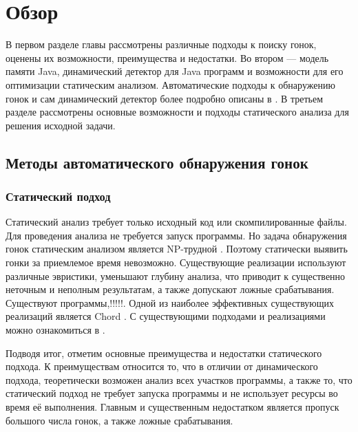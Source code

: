 \chapter{Обзор}
\label{chapSVD}

В первом разделе главы рассмотрены различные подходы к поиску гонок, оценены их возможности, преимущества и недостатки. 
Во втором --- модель памяти Java, динамический детектор для Java программ и возможности для его оптимизации статическим анализом.
Автоматические подходы к обнаружению гонок и сам динамический детектор более подробно описаны в \cite{DRD}.
В третьем разделе рассмотрены основные возможности и подходы статического анализа для решения исходной задачи.


\FloatBarrier
\section{Методы автоматического обнаружения гонок}
\subsection{Статический подход}
\label{StaticRaceDetection}
Статический анализ требует только исходный код или скомпилированные файлы. Для проведения анализа не требуется запуск программы. Но задача обнаружения гонок статическим анализом является NP-трудной \cite{RaceDetectionReview, RaceDetection}. Поэтому статически выявить гонки за приемлемое время невозможно. Существующие реализации используют различные эвристики, уменьшают глубину анализа, что приводит к существенно неточным и неполным результатам, а также допускают ложные срабатывания. Существуют программы,!!!!!. Одной из наиболее эффективных существующих реализаций является Chord \cite{Chord, JChord}.
 С существующими подходами и реализациями можно ознакомиться в \cite{Naik:2006:ESR:1133255.1134018, RacerX}.

Подводя итог, отметим основные преимущества и недостатки статического подхода. К преимуществам относится то, что в отличии от динамического подхода, теоретически возможен анализ всех участков программы, а также то, что статический подход не требует запуска программы и не использует ресурсы во время её выполнения. Главным и существенным недостатком является
пропуск большого числа гонок, а также ложные срабатывания. 


